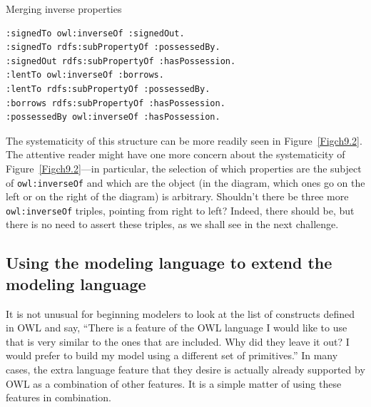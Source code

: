 \begin{challenge}{Merging inverse properties}
\begin{lstlisting}
:signedTo owl:inverseOf :signedOut.
:signedTo rdfs:subPropertyOf :possessedBy.
:signedOut rdfs:subPropertyOf :hasPossession.
:lentTo owl:inverseOf :borrows.
:lentTo rdfs:subPropertyOf :possessedBy.
:borrows rdfs:subPropertyOf :hasPossession.
:possessedBy owl:inverseOf :hasPossession.
\end{lstlisting}

The systematicity of this structure can be more readily seen in Figure~\ref{Figch9.2}. 
The attentive reader might have one more concern about the
systematicity of Figure~\ref{Figch9.2}---in particular, the selection of which
properties are the subject of \texttt{owl:inverseOf} and which are the object (in
the diagram, which ones go on the left or on the right of the diagram)
is arbitrary. Shouldn't there be three more \texttt{owl:inverseOf} triples,
pointing from right to left? Indeed, there should be, but there is no
need to assert these triples, as we shall see in the next challenge.
\end{challenge}


\subsection{Using the modeling language to extend the modeling language}

It is not unusual for beginning modelers to look at the list of
constructs defined in OWL and say, ``There is a feature of the OWL
language I would like to use that is very similar to the ones that are
included. Why did they leave it out? I would prefer to build my model
using a different set of primitives.'' In many cases, the extra language
feature that they desire is actually already supported by OWL as a
combination of other features. It is a simple matter of using these
features in combination.

